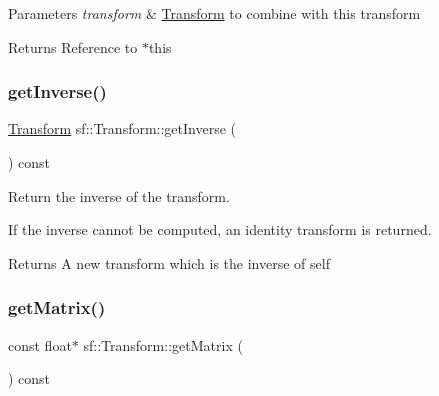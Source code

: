 \begin{DoxyParams}{Parameters}
{\em transform} & \mbox{\hyperlink{classsf_1_1_transform}{Transform}} to combine with this transform\\
\hline
\end{DoxyParams}
\begin{DoxyReturn}{Returns}
Reference to $\ast$this \begin{DoxyVerb}\end{DoxyVerb}
 
\end{DoxyReturn}
\mbox{\label{classsf_1_1_transform_a14f49e81af44aabcff7611f6703a1e4a}} 
\subsubsection{\texorpdfstring{getInverse()}{getInverse()}}
{\footnotesize\ttfamily \mbox{\hyperlink{classsf_1_1_transform}{Transform}} sf\+::\+Transform\+::get\+Inverse (\begin{DoxyParamCaption}{ }\end{DoxyParamCaption}) const}



Return the inverse of the transform. 

If the inverse cannot be computed, an identity transform is returned.

\begin{DoxyReturn}{Returns}
A new transform which is the inverse of self \begin{DoxyVerb}\end{DoxyVerb}
 
\end{DoxyReturn}
\mbox{\label{classsf_1_1_transform_ad52616cac686f47bd26bcbdd8e2add40}} 
\subsubsection{\texorpdfstring{getMatrix()}{getMatrix()}}
{\footnotesize\ttfamily const float$\ast$ sf\+::\+Transform\+::get\+Matrix (\begin{DoxyParamCaption}{ }\end{DoxyParamCaption}) const}



